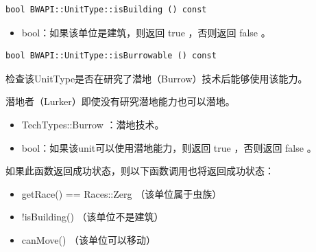 \begin{tcolorbox}[colback=white, colframe=black!60!white, title=isBuilding(), arc=0mm]
    \begin{verbatim}
bool BWAPI::UnitType::isBuilding () const
    \end{verbatim}
\begin{return}
\begin{itemize}
    \item bool：如果该单位是建筑，则返回   true  ，否则返回   false  。
\end{itemize}
\end{return}
\end{tcolorbox}


\begin{tcolorbox}[colback=white, colframe=black!60!white, title=isBurrowable(), arc=0mm]
    \begin{verbatim}
bool BWAPI::UnitType::isBurrowable () const
    \end{verbatim}
    检查该UnitType是否在研究了潜地（Burrow）技术后能够使用该能力。
\begin{note}
    潜地者（Lurker）即使没有研究潜地能力也可以潜地。
\end{note}
\begin{refer}
    \begin{itemize}
        \item TechTypes::Burrow  ：潜地技术。
    \end{itemize}
\end{refer}
\begin{return}
\begin{itemize}
    \item bool：如果该unit可以使用潜地能力，则返回   true  ，否则返回   false  。
\end{itemize}
\end{return}
\begin{note}
    如果此函数返回成功状态，则以下函数调用也将返回成功状态：
    \begin{itemize}
        \item  getRace() == Races::Zerg  （该单位属于虫族）
        \item !isBuilding()  （该单位不是建筑）
        \item canMove()  （该单位可以移动）
    \end{itemize}
\end{note}
\end{tcolorbox}



